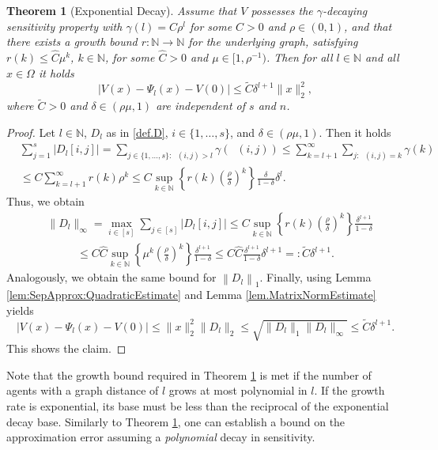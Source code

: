 \documentclass{article}
\def\N{\mathbb{N}}
\DeclareMathOperator{\distG}{\operatorname{dist_\mathcal{G}}} %
\newcommand{\agents}{\lbrace 1, \dots, s \rbrace}
\newcommand{\norm}[1]{\left\lVert {#1} \right\rVert}
\newtheorem{theorem}[lemma]{Theorem}
\begin{document}
\begin{theorem}[Exponential Decay]\label{thm.ExpDecay}
Assume that $V$ possesses the $\gamma$-decaying sensitivity property with $\gamma(l) = C \rho^{l}$ for some $C > 0$ and $\rho \in (0,1)$, and that there exists a growth bound $r \colon \N \to \N$ for the underlying graph, satisfying  $r(k) \leq \widehat{C} \mu^k$, $k \in \N$, for some $\widehat{C} > 0$ and $\mu \in [1, \rho^{-1})$. Then for all $l \in \N$ and all $x \in \Omega$ it holds 
    \begin{equation*}
        \lvert V(x) - \Psi_l(x) - V(0) \rvert \leq \widetilde{C} \delta^{l+1} \lVert x \rVert_2^2, 
    \end{equation*}
    where $\widetilde{C} > 0$ and $\delta \in (\rho \mu, 1)$ are independent of $s$ and $n$.  
\end{theorem}
\begin{proof}
Let $l \in \N$, $D_l$ as in \eqref{def.D}, $i \in \agents$, and $\delta \in (\rho \mu, 1)$. Then it holds
\begin{align*}
    & \sum_{j=1}^s \lvert D_l[i,j] \rvert = \sum_{j \in \agents: \distG(i,j) > l} \gamma(\distG(i,j)) \leq \sum_{k = l+1}^\infty \sum_{j : \distG(i,j) = k} \gamma(k) \\ 
    & \leq  C \sum_{k = l+1}^\infty r(k) \rho^k 
    \leq C \sup_{k \in \N} \left\lbrace r(k) \left(\frac{\rho}{\delta}\right)^k \right\rbrace \frac{\delta}{1-\delta} \delta^l. 
\end{align*}
Thus, we obtain 
\begin{align*}
    & \lVert  D_l \rVert_\infty = \max_{i \in [s]} \sum_{j \in [s]} \lvert  D_l[i,j] \rvert 
    \leq C \sup_{k \in \N} \left\lbrace r(k)  \left(\frac{\rho}{\delta}\right)^k \right\rbrace \frac{\delta^{l+1}}{1-\delta} 
        \end{align*}
    \begin{align*}
    \leq C \widehat{C} \sup_{k \in \N} \left\lbrace \mu^k  \left(\frac{\rho}{\delta}\right)^k \right\rbrace \frac{\delta^{l+1}}{1-\delta}  \leq C \widehat{C} \frac{\delta^{l+1}}{1-\delta} \delta^{l+1} =: \widetilde{C}  \delta^{l+1}.
\end{align*}
Analogously, we obtain the same bound for $\norm{D_l}_1$. Finally, using Lemma \ref{lem:SepApprox:QuadraticEstimate} and Lemma \ref{lem.MatrixNormEstimate} yields 
\begin{equation*}
    \lvert V(x) - \Psi_l(x) - V(0) \rvert \leq \lVert x \rVert_2^2 \lVert D_l \rVert_2 \leq \sqrt{\lVert D_l \rVert_1 \lVert D_l \rVert_\infty} \leq \widetilde{C}  \delta^{l+1}. 
\end{equation*}
This shows the claim. 
\end{proof}
Note that the growth bound required in Theorem \ref{thm.ExpDecay} is met if the number of agents with a graph distance of $l$ grows at most polynomial in $l$. If the growth rate is exponential, its base must be less than the reciprocal of the exponential decay base. Similarly to Theorem \ref{thm.ExpDecay}, one can establish a bound on the approximation error assuming a \emph{polynomial} decay in sensitivity. 
\end{document}
